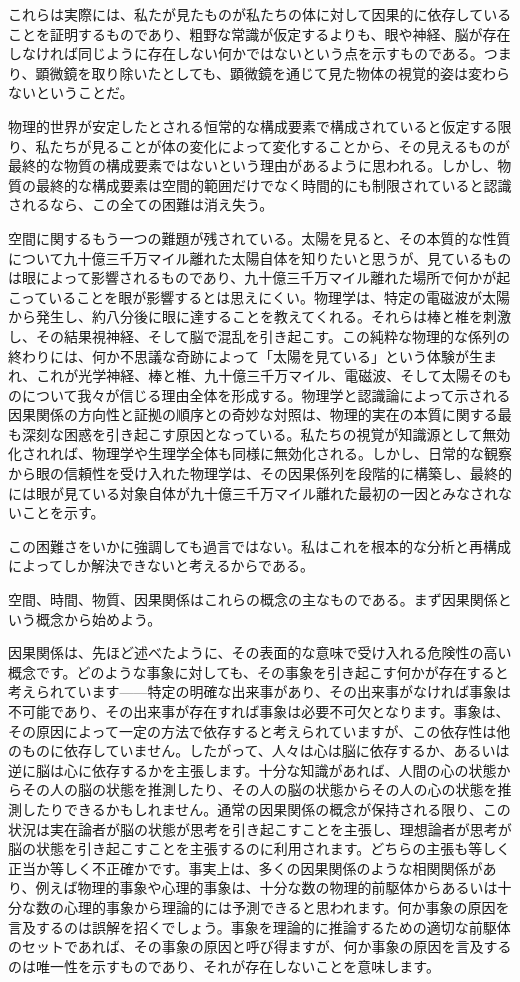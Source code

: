 \documentclass[a4paper,11pt,openany]{ltjsbook}
\begin{document}
これらは実際には、私たが見たものが私たちの体に対して因果的に依存していることを証明するものであり、粗野な常識が仮定するよりも、眼や神経、脳が存在しなければ同じように存在しない何かではないという点を示すものである。つまり、顕微鏡を取り除いたとしても、顕微鏡を通じて見た物体の視覚的姿は変わらないということだ。

物理的世界が安定したとされる恒常的な構成要素で構成されていると仮定する限り、私たちが見ることが体の変化によって変化することから、その見えるものが最終的な物質の構成要素ではないという理由があるように思われる。しかし、物質の最終的な構成要素は空間的範囲だけでなく時間的にも制限されていると認識されるなら、この全ての困難は消え失う。

空間に関するもう一つの難題が残されている。太陽を見ると、その本質的な性質について九十億三千万マイル離れた太陽自体を知りたいと思うが、見ているものは眼によって影響されるものであり、九十億三千万マイル離れた場所で何かが起こっていることを眼が影響するとは思えにくい。物理学は、特定の電磁波が太陽から発生し、約八分後に眼に達することを教えてくれる。それらは棒と椎を刺激し、その結果視神経、そして脳で混乱を引き起こす。この純粋な物理的な係列の終わりには、何か不思議な奇跡によって「太陽を見ている」という体験が生まれ、これが光学神経、棒と椎、九十億三千万マイル、電磁波、そして太陽そのものについて我々が信じる理由全体を形成する。物理学と認識論によって示される因果関係の方向性と証拠の順序との奇妙な対照は、物理的実在の本質に関する最も深刻な困惑を引き起こす原因となっている。私たちの視覚が知識源として無効化されれば、物理学や生理学全体も同様に無効化される。しかし、日常的な観察から眼の信頼性を受け入れた物理学は、その因果係列を段階的に構築し、最終的には眼が見ている対象自体が九十億三千万マイル離れた最初の一因とみなされないことを示す。

この困難さをいかに強調しても過言ではない。私はこれを根本的な分析と再構成によってしか解決できないと考えるからである。

空間、時間、物質、因果関係はこれらの概念の主なものである。まず因果関係という概念から始めよう。

因果関係は、先ほど述べたように、その表面的な意味で受け入れる危険性の高い概念です。どのような事象に対しても、その事象を引き起こす何かが存在すると考えられています——特定の明確な出来事があり、その出来事がなければ事象は不可能であり、その出来事が存在すれば事象は必要不可欠となります。事象は、その原因によって一定の方法で依存すると考えられていますが、この依存性は他のものに依存していません。したがって、人々は心は脳に依存するか、あるいは逆に脳は心に依存するかを主張します。十分な知識があれば、人間の心の状態からその人の脳の状態を推測したり、その人の脳の状態からその人の心の状態を推測したりできるかもしれません。通常の因果関係の概念が保持される限り、この状況は実在論者が脳の状態が思考を引き起こすことを主張し、理想論者が思考が脳の状態を引き起こすことを主張するのに利用されます。どちらの主張も等しく正当か等しく不正確かです。事実上は、多くの因果関係のような相関関係があり、例えば物理的事象や心理的事象は、十分な数の物理的前駆体からあるいは十分な数の心理的事象から理論的には予測できると思われます。何か事象の原因を言及するのは誤解を招くでしょう。事象を理論的に推論するための適切な前駆体のセットであれば、その事象の原因と呼び得ますが、何か事象の原因を言及するのは唯一性を示すものであり、それが存在しないことを意味します。
\end{document}
